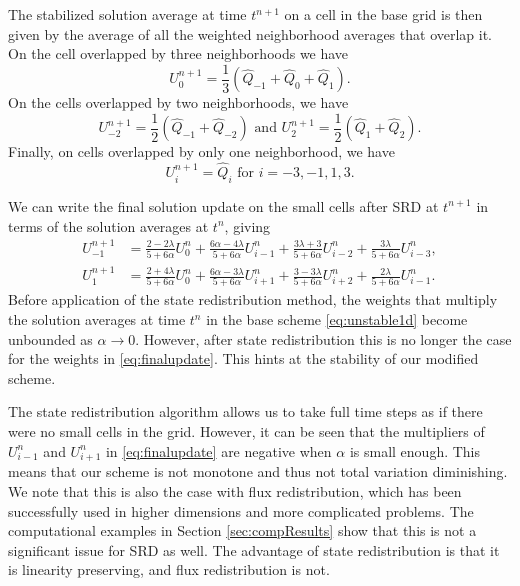 The stabilized solution average at time $t^{n+1}$ on a cell in the base grid is then 
given by the average of all the weighted neighborhood averages that overlap it.  
On the cell overlapped by three neighborhoods we have
\begin{equation} \label{eq:threeneigh}
U^{n+1}_{0} = \frac{1}{3}(\widehat{Q}_{-1}+\widehat{Q}_{0}+\widehat{Q}_{1}).
\end{equation}
On the  cells overlapped by two neighborhoods, we have
\begin{equation} \label{eq:twoneigh}
U^{n+1}_{-2} = \frac{1}{2}(\widehat{Q}_{-1}+\widehat{Q}_{-2}) \text{ and } U^{n+1}_{2} = \frac{1}{2}(\widehat{Q}_{1}+\widehat{Q}_{2}).
\end{equation}
Finally, on cells overlapped by only one neighborhood,  we have
\begin{equation} \label{eq:oneneigh}
	U^{n+1}_i = \widehat{Q}_i \text{ for } i = -3,-1,1,3.
\end{equation}

We can write the final solution update on the small cells after SRD  at $t^{n+1}$ in terms of the solution 
averages at $t^{n}$, giving
\begin{equation}
\begin{aligned}
U^{n+1}_{-1} &= \frac{2-2\lambda}{5+6\alpha}U^n_0 + \frac{6\alpha - 4 \lambda}{5+6\alpha}U^n_{i-1}+ \frac{3\lambda + 3}{5+6\alpha}U^n_{i-2}+\frac{3\lambda }{5+6\alpha}U^n_{i-3}, \\
U^{n+1}_{1} &= \frac{2+4\lambda}{5+6\alpha}U^n_0 + \frac{6\alpha - 3 \lambda}{5+6\alpha}U^n_{i+1}+ \frac{3-3\lambda}{5+6\alpha}U^n_{i+2}+\frac{2\lambda }{5+6\alpha}U^n_{i-1}.
\end{aligned} \label{eq:finalupdate}
\end{equation}
Before application of the state redistribution method, the weights that multiply the solution averages at time $t^n$ in the base scheme \eqref{eq:unstable1d} become unbounded as $\alpha \rightarrow 0$.
However, after state redistribution this is no longer the case for the weights 
in \eqref{eq:finalupdate}.  This hints at the stability of our modified scheme.  

The state redistribution algorithm allows us to take full time steps as if there were no 
small cells in the grid.  However, it can be seen that the multipliers of $U^n_{i-1}$ and $U^n_{i+1}$ 
in \eqref{eq:finalupdate} are negative when $\alpha$ is small enough.  This means that our scheme is not 
monotone and thus not total variation diminishing.  We note that this is also the case 
with flux redistribution, which has been successfully used in higher dimensions and more
complicated problems.  
The computational examples in Section \ref{sec:compResults} show that
this is not a significant issue for SRD as well.
The advantage of state redistribution  is that it is linearity
preserving, and flux redistribution is not. 

